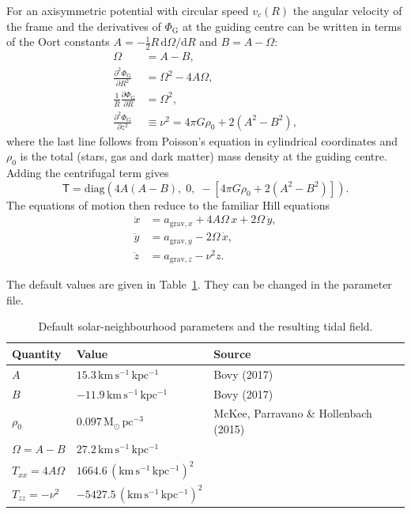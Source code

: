 \documentclass[11pt,a4paper]{article}
\newcommand{\T}{\mathsf{T}}
\newcommand{\kmskpc}{\mathrm{km\,s^{-1}\,kpc^{-1}}}
\begin{document}
For an axisymmetric potential with circular speed $v_c(R)$ the angular
velocity of the frame and the derivatives of $\Phi_{\mathrm G}$ at the
guiding centre can be written in terms of the Oort constants
$A = -\tfrac12 R\,\mathrm{d}\Omega/\mathrm{d}R$ and $B = A-\Omega$:
\begin{align}
  \Omega &= A - B, \\
  \frac{\partial^2\Phi_{\mathrm G}}{\partial R^2} &= \Omega^2 - 4A\Omega, \\
  \frac{1}{R}\frac{\partial\Phi_{\mathrm G}}{\partial R} &= \Omega^2, \\
  \frac{\partial^2\Phi_{\mathrm G}}{\partial z^2} &\equiv \nu^2
     = 4\pi G\rho_0 + 2\left(A^2 - B^2\right),
\end{align}
where the last line follows from Poisson's equation in cylindrical
coordinates and $\rho_0$ is the total (stars, gas and dark matter)
mass density at the guiding centre. Adding the centrifugal term gives
\begin{equation}
  \T = \mathrm{diag}\left(4A(A-B),\; 0,\; -\left[4\pi G\rho_0 +
  2\left(A^2-B^2\right)\right]\right).
\end{equation}
The equations of motion then reduce to the familiar Hill equations
\begin{align}
  \ddot x &= a_{\mathrm{grav},x} + 4A\Omega\, x + 2\Omega\,\dot y, \\
  \ddot y &= a_{\mathrm{grav},y} - 2\Omega\,\dot x, \\
  \ddot z &= a_{\mathrm{grav},z} - \nu^2 z .
\end{align}

The default values are given in Table~\ref{tab:solar}. They can be
changed in the parameter file.

\begin{table}[h]
\centering
\begin{tabular}{lll}
\toprule
Quantity & Value & Source \\
\midrule
$A$ & $15.3\,\kmskpc$ & Bovy (2017) \\
$B$ & $-11.9\,\kmskpc$ & Bovy (2017) \\
$\rho_0$ & $0.097\,\mathrm{M_\odot\,pc^{-3}}$ & McKee, Parravano \& Hollenbach (2015) \\
\midrule
$\Omega = A-B$ & $27.2\,\kmskpc$ & \\
$T_{xx} = 4A\Omega$ & $1664.6\,(\kmskpc)^2$ & \\
$T_{zz} = -\nu^2$ & $-5427.5\,(\kmskpc)^2$ & \\
\bottomrule
\end{tabular}
\caption{Default solar-neighbourhood parameters and the resulting
tidal field.}
\label{tab:solar}
\end{table}
\end{document}
